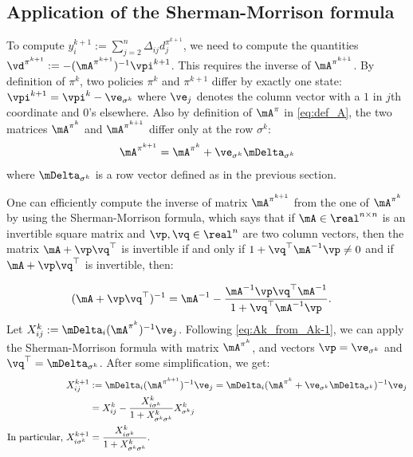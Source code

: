 \subsection{Application of the Sherman-Morrison formula}
\label{ssec:sm_form}


To compute $y^{k+1}_i := \sum_{j=2}^n\Delta_{ij}d_j^{\pi^{k+1}}$, we need to compute the quantities $\vd^{\pi^{k+1}} := -(\mA^{\pi^{k+1}})^{-1}\vpi^{k+1}$.
This requires the inverse of ${\mA^{\pi^{k+1}}}$.
By definition of $\pi^k$, two policies $\pi^k$ and $\pi^{k+1}$ differ by exactly one state: $\vpi^{k+1}=\vpi^k - \ve_{\sigma^k}$ where $\ve_j$ denotes the column vector with a $1$ in $j$th coordinate and $0$'s elsewhere.
Also by definition of $\mA^\pi$ in \eqref{eq:def_A}, the two matrices $\mA^{\pi^k}$ and $\mA^{\pi^{k+1}}$ differ only at the row $\sigma^k$:
\begin{align}
    \mA^{\pi^{k+1}} = \mA^{\pi^k} + \ve_{\sigma^k} \mDelta_{\sigma^k}
    \label{eq:Ak_from_Ak-1}
\end{align}
where $\mDelta_{\sigma^k}$ is a row vector defined as in the previous section.

One can efficiently compute the inverse of matrix $\mA^{\pi^{k+1}}$ from the one of $\mA^{\pi^k}$ by using the Sherman-Morrison formula, which says that if $\mA\in\real^{n\times n}$ is an invertible square matrix and $\vp, \vq\in\real^n$ are two column vectors, then the matrix $\mA+\vp\vq^\top$ is invertible if and only if $1+\vq^\top \mA^{-1}\vp\neq0$ and if $\mA+\vp\vq^\top$ is invertible, then:

\begin{align*}
    (\mA + \vp\vq^\top)^{-1}
    &=\mA^{-1} - \frac{\mA^{-1}\vp\vq^\top \mA^{-1}}{1+\vq^\top \mA^{-1}\vp}.
\end{align*}
Let $X^k_{ij} := \mDelta_i (\mA^{\pi^k})^{-1}\ve_j$. Following \eqref{eq:Ak_from_Ak-1}, we can apply the Sherman-Morrison formula with matrix $\mA^{\pi^k}$, and vectors $\vp=\ve_{\sigma^k}$ and $\vq^\top=\mDelta_{\sigma^k}$. After some simplification, we get:
\begin{align}
    X^{k+1}_{ij} &:= \mDelta_i (\mA^{\pi^{k+1}})^{-1}\ve_j =\mDelta_i (\mA^{\pi^k}+\ve_{\sigma^k}\mDelta_{\sigma^k})^{-1}\ve_j\nonumber\\
                 &= X^{k}_{ij} - \frac{X^{k}_{i\sigma^k} }{1+X^{k}_{\sigma^k \sigma^k}}X^{k}_{\sigma^k j} \label{eq:X^k+1-i} \\
    \text{In particular,}\ X^{k+1}_{i\sigma^k} &=\frac{X^{k}_{i\sigma^k}}{1+X^{k}_{\sigma^k \sigma^k}}.\nonumber
\end{align}

